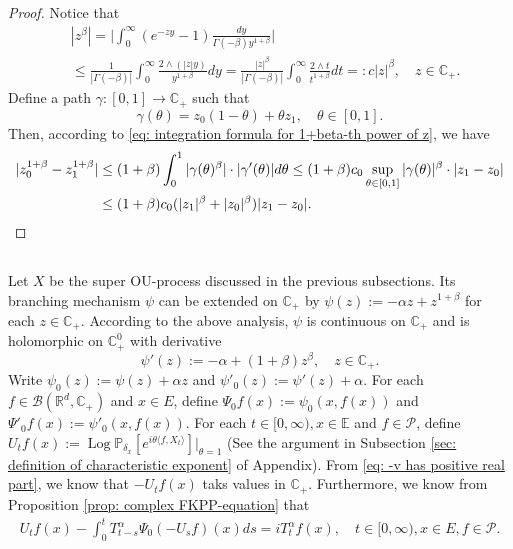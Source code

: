 \documentclass[12pt,oneside,english]{amsart}
\theoremstyle{plain}
\theoremstyle{definition}
\numberwithin{equation}{section}
\begin{document}
\begin{proof}
    Notice that
\begin{align}
\label{eq: upper bound for beta power of z}
    &|z^{\beta}|
    = \Big|\int_0^\infty (e^{-zy}-1) \frac{dy}{\Gamma(-\beta)y^{1+\beta}}\Big|
    \\&\leq \frac{1}{|\Gamma(-\beta)|}\int_0^\infty \frac{2\wedge (|z|y)}{y^{1+\beta}}dy
    = \frac{|z|^{\beta}}{|\Gamma(-\beta)|}\int_0^\infty \frac{2\wedge t}{t^{1+\beta}}dt =: c |z|^{\beta},
    \quad z\in \mathbb C_+.
\end{align}
    Define a path $\gamma: [0,1] \to \mathbb C_+$ such that
\[
    \gamma(\theta)
    = z_0 (1-\theta) + \theta z_1,
    \quad \theta \in [0,1].
\]
    Then, according to \eqref{eq: integration formula for 1+beta-th power of z}, we have
\begin{align}
    |z_0^{1+\beta} - z_1^{1+\beta}|
    &\leq (1+\beta) \int_0^1 |\gamma(\theta)^{\beta}|\cdot |\gamma'(\theta)|d\theta
    \leq (1+\beta) c_0 \sup_{\theta \in [0,1]} |\gamma(\theta)|^{\beta} \cdot |z_1-z_0|
    \\&\leq (1+\beta) c_0 ( |z_1|^{\beta}+|z_0|^{\beta} ) |z_1-z_0|.
    \qedhere
\end{align}
\end{proof}
\subsection{}
    Let $X$ be the super OU-process discussed in the previous subsections.
    Its branching mechanism $\psi$ can be extended on $\mathbb C_+$ by $\psi(z) := -\alpha z + z^{1+\beta}$ for each $z\in \mathbb C_+$.
    According to the above analysis, $\psi$ is continuous on $\mathbb C_+$ and is holomorphic on $\mathbb C_+^0$ with derivative
\begin{equation}
\label{eq: deriavetive of the Poission part}
    \psi'(z) := -\alpha + (1+\beta)z^{\beta},
    \quad z\in \mathbb C_+.
\end{equation}
    Write $\psi_0(z) := \psi(z) + \alpha z$ and $\psi'_0(z) := \psi'(z) + \alpha$.
    For each $f\in \mathscr B(\mathbb R^d, \mathbb C_+)$ and $x\in E$, define $\Psi_0f(x) := \psi_0(x,f(x))$ and $\Psi'_0 f(x) := \psi'_0(x,f(x))$.
    For each $t\in [0,\infty), x\in \mathbb E$ and $f \in \mathcal{P}$, define $U_tf(x) := \operatorname{Log} \mathbb P_{\delta_x}[e^{i\theta \langle f, X_t\rangle}]|_{\theta = 1}$
    (See the argument in Subsection \ref{sec: definition of characteristic exponent} of Appendix).
    From \eqref{eq: -v has positive real part}, we know that $-U_tf(x)$ taks values in $\mathbb C_+$. Furthermore, we know from Proposition \ref{prop: complex FKPP-equation} that
\begin{align}
\label{eq:chareq2}
    U_tf(x)-\int_0^t T^{\alpha}_{t-s} \Psi_0(-U_sf)(x)ds
    =i T^{\alpha}_t f(x),
    \quad t\in [0,\infty), x\in E, f\in \mathcal P.
\end{align}
\end{document}
